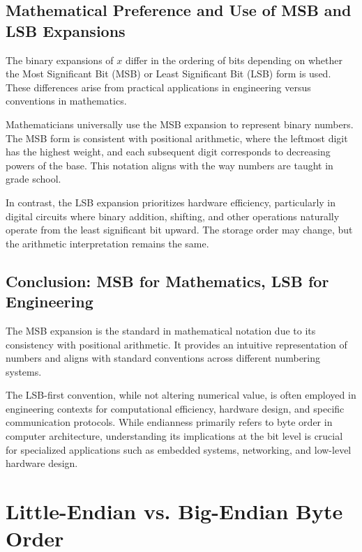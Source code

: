 \subsection{Mathematical Preference and Use of MSB and LSB Expansions}

The binary expansions of \( x \) differ in the ordering of bits depending on whether the Most Significant Bit (MSB) or Least Significant Bit (LSB) form is used. These differences arise from practical applications in engineering versus conventions in mathematics.

Mathematicians universally use the MSB expansion to represent binary numbers. The MSB form is consistent with positional arithmetic, where the leftmost digit has the highest weight, and each subsequent digit corresponds to decreasing powers of the base. This notation aligns with the way numbers are taught in grade school.

In contrast, the LSB expansion prioritizes hardware efficiency, particularly in digital circuits where binary addition, shifting, and other operations naturally operate from the least significant bit upward. The storage order may change, but the arithmetic interpretation remains the same.

\subsection{Conclusion: MSB for Mathematics, LSB for Engineering}
The MSB expansion is the standard in mathematical notation due to its consistency with positional arithmetic. It provides an intuitive representation of numbers and aligns with standard conventions across different numbering systems.

The LSB-first convention, while not altering numerical value, is often employed in engineering contexts for computational efficiency, hardware design, and specific communication protocols. While endianness primarily refers to byte order in computer architecture, understanding its implications at the bit level is crucial for specialized applications such as embedded systems, networking, and low-level hardware design.

\section{Little-Endian vs. Big-Endian Byte Order}

